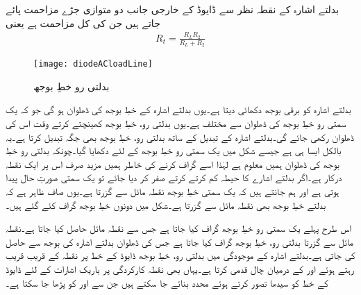بدلتے اشارہ کے نقطہ نظر سے ڈایوڈ کے خارجی جانب دو متوازی جڑے مزاحمت پائے جاتے ہیں جن کی کل مزاحمت   ہے یعنی
\begin{align}
R_t= \frac{R_L R_2}{R_L+R_2}
\end{align}
%
\begin{figure}
\centering
\texttt{[image: diodeACloadLine]}
\caption{بدلتی رو خطِ بوجھ}
\label{شکل_ڈایوڈ_بدلتا_بار_کا_خط}
\end{figure}
بدلتے اشارہ کو  برقی بوجھ دکھائی دیتا ہے۔یوں بدلتے اشارہ کے خطِ بوجھ کی ڈھلوان  ہو گی جو کہ یک سمتی رو خطِ بوجھ کی ڈھلوان سے مختلف ہے۔یوں بدلتی رو، خطِ بوجھ کھینچتے کرتے وقت اس کی ڈھلوان  رکھی جائے گی۔بدلتے اشارہ کے تبدیل کے ساتھ  بدلتی رو، خطِ بوجھ بھی جگہ تبدیل کرتا ہے۔یہ بالکل ایسا ہی ہے جیسے شکل   میں یک سمتی رو خطِ بوجھ کے لئے دکھایا گیا۔چونکہ بدلتی رو خطِ بوجھ کی ڈھلوان ہمیں معلوم ہے لہٰذا اسے گراف کرنے کی خاطر ہمیں مزید صرف اس پر ایک نقطہ درکار ہے۔اگر بدلتے اشارے کا حیطہ کم کرتے کرتے صفر کر دیا جائے تو یک سمتی صورتِ حال پیدا ہوتی ہے اور ہم جانتے ہیں کہ یک سمتی خطِ بوجھ نقطہ مائل سے گزرتا ہے۔یوں صاف ظاہر ہے کہ بدلتے خطِ بوجھ بھی نقطہ مائل سے گزرتا ہے۔شکل  میں دونوں خطِ بوجھ گراف کئے گئے ہیں۔

اس طرح پہلے یک سمتی رو خطِ بوجھ گراف کیا جاتا ہے جس سے نقطہ مائل حاصل کیا جاتا ہے۔نقطہ مائل سے گزرتا بدلتی رو، خطِ بوجھ گراف کیا جاتا ہے جس کی ڈھلوان بدلتے اشارہ کی  بوجھ سے حاصل کی جاتی ہے۔بدلتے اشارہ کے موجودگی میں بدلتی رو، خطِ بوجھ ڈایوڈ کے خط پر نقطہ  کے قریب قریب رہتے ہوئے   اور  کے درمیان چال قدمی کرتا ہے۔یہاں بھی نقطہ کارکردگی پر باریک اشارات کے لئے ڈایوڈ کے خط کو سیدھا تصور کرتے ہوئے محدد  بنائے جا سکتے ہیں جن سے اور  کو پڑھا جا سکتا ہے۔

